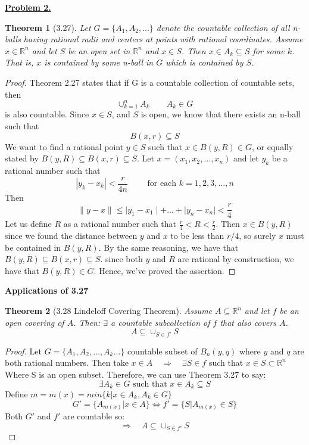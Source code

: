 \documentclass[aps,pra,notitlepage,amsmath,amssymb,letterpaper,12pt]{revtex4-1}
\newtheorem{theorem}{Theorem}
\begin{document}
\underline{\textbf{Problem 2.}}
\begin{theorem}[3.27] \nonumber
Let $G = \{A_{1},A_{2},...\}$ denote the countable collection of all n-balls having rational radii and centers at points with rational coordinates. Assume $x \in \mathbb{R}^n$ and let $S$ be an open set in $\mathbb{R}^n$ and $x \in S$. Then $x \in A_{k} \subseteq S$ for some $k$. That is, $x$ is contained by some n-ball in $G$ which is contained by $S$.
\end{theorem}
\begin{proof}
Theorem 2.27 states that if G is a countable collection of countable sets, then
\[\cup_{k=1}^{n} A_{k} \qquad A_{k} \in G\]
is also countable. Since $x \in S$, and $S$ is open, we know that there exists an n-ball such that
\[B(x,r) \subseteq S\]
We want to find a rational point $y\in S$ such that $x \in B(y,R) \in G$, or equally stated by $B(y,R) \subseteq B(x,r) \subseteq S$. Let
$x=(x_{1},x_{2},...,x_{n})$ and let $y_{k}$ be a rational number such that
\[\left| y_{k} - x_{k} \right| < \frac{r}{4n} \qquad \textrm{ for each } k=1,2,3,...,n\]
Then
\[\|y-x\| \leq \mid y_{1}-x_{1} \mid + ... + \mid y_{n}-x_{n} \mid < \frac{r}{4}\]
Let us define $R$ as a rational number such that $\frac{r}{4} < R < \frac{r}{2}$. Then
$x \in B(y,R)$ since we found the distance between $y$ and $x$ to be less than $r/4$, so surely $x$ must be contained in $B(y,R)$. By the same reasoning, we have that $B(y,R) \subseteq B(x,r) \subseteq S$. since both $y$ and $R$ are rational by construction, we have that $B(y,R) \in G$. Hence, we've proved the assertion.
\end{proof}
\textbf{Applications of 3.27}
\begin{theorem}[3.28 Lindeloff Covering Theorem]
Assume $A\subseteq \mathbb{R}^n$ and let $f$ be an open covering of $A$. Then: $\exists$ a countable subcollection of $f$ that also covers $A$.  $$A\subseteq \cup_{S\in f'}S$$
\end{theorem}
\begin{proof}
Let $G=\{A_1,A_2, \ldots ,A_k\ldots \}$ countable subset of $B_n(y,q)$ where $y$ and $q$ are both rational numbers.  Then take $x\in A \quad \Rightarrow \quad \exists S \in f$ such that $x\in S \subset \mathbb{R}^n$ Where S is an open subset.  Therefore, we can use Theorem 3.27 to say: $$\exists A_k \in G \textrm{ such that } x\in A_k\subseteq S$$
Define $m=m(x)=min\{k|x\in A_k,A_k\in G\}$  
$$G'=\{A_{m(x)}|x\in A\}  \iff f'=\{S|A_{m(x)}\in S\}$$
Both $G'$ and $f'$ are countable so: $$\Rightarrow \quad A\subseteq \cup_{S\in f'}S$$
\end{proof}
\end{document}
